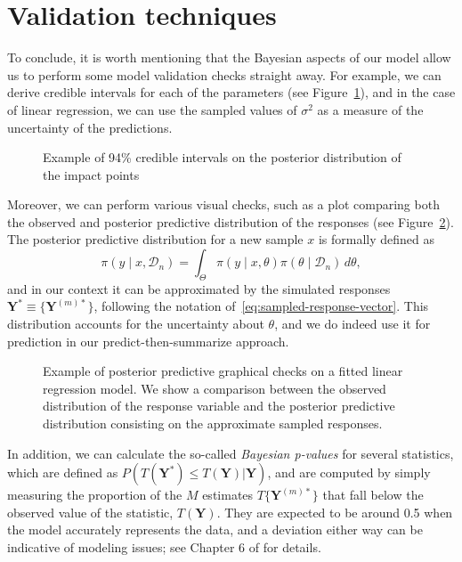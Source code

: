 \section{Validation techniques}

To conclude, it is worth mentioning that the Bayesian aspects of our model allow us to perform some model validation checks straight away. For example, we can derive credible intervals for each of the parameters (see Figure~\ref{fig:credible_intervals}), and in the case of linear regression, we can use the sampled values of \(\sigma^2\) as a measure of the uncertainty of the predictions.

\begin{figure}[ht!]
  \centering
    \setlength{\fboxrule}{.5pt}%
  \caption{Example of 94\% credible intervals on the posterior distribution of the impact points}\label{fig:credible_intervals}
\end{figure}


Moreover, we can perform various visual checks, such as a plot comparing both the observed and posterior predictive distribution of the responses (see Figure~\ref{fig:ppc}). The posterior predictive distribution for a new sample \(x\) is formally defined as
\[
\pi(y\mid x, \mathcal D_n) = \int_{\Theta} \pi(y\mid x, \theta)\pi(\theta\mid \mathcal D_n)\, d\theta,
\]
and in our context it can be approximated by the simulated responses \(\symbf Y^* \equiv \{\symbf Y^{(m)*}\}\), following the notation of~\eqref{eq:sampled-response-vector}. This distribution accounts for the uncertainty about \(\theta\), and we do indeed use it for prediction in our predict-then-summarize approach.

\begin{figure}[ht!]
  \centering
  \setlength{\fboxrule}{.5pt}%
  \caption{Example of posterior predictive graphical checks on a fitted linear regression model. We show a comparison between the observed distribution of the response variable and the posterior predictive distribution consisting on the approximate sampled responses.}\label{fig:ppc}
\end{figure}


In addition, we can calculate the so-called \textit{Bayesian p-values} for several statistics, which are defined as \(P(T(\symbf Y^*)\leq T(\symbf Y)| \symbf Y)\), and are computed by simply measuring the proportion of the \(M\) estimates \(T\{\symbf Y^{(m)*}\}\) that fall below the observed value of the statistic, \(T(\symbf{Y})\). They are expected to be around 0.5 when the model accurately represents the data, and a deviation either way can be indicative of modeling issues; see Chapter 6 of \citet{gelman2013bayesian} for details.
